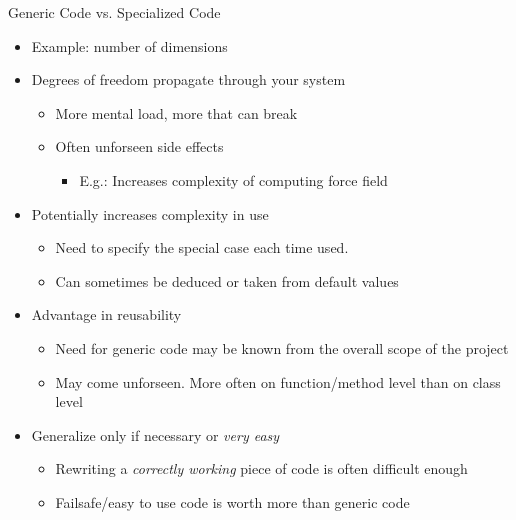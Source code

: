\begin{frame}{Generic Code vs. Specialized Code}
%
\begin{itemize}
\item Example: number of dimensions
\item Degrees of freedom propagate through your system
	\begin{itemize}
	\item[\Thus] More mental load, more that can break
	\item Often unforseen side effects
		\begin{itemize}
		\item E.\;g.: Increases complexity of computing force field
		\end{itemize}
	\end{itemize}
\item Potentially increases complexity in use
	\begin{itemize}
	\item Need to specify the special case each time used. 
	\item Can sometimes be deduced or taken from default values
	\end{itemize}
\item Advantage in reusability
	\begin{itemize}
	\item Need for generic code may be known from the overall scope of the project
	\item May come unforseen. More often on function/method level than on class level
	\end{itemize}
\item[\Thus] Generalize only if necessary or \emph{very easy}
	\begin{itemize}
	\item Rewriting a \emph{correctly working} piece of code is often difficult enough
	\item Failsafe/easy to use code is worth more than generic code
	\end{itemize}
\end{itemize}
%
\end{frame}


